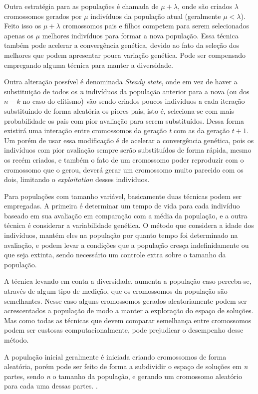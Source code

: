 Outra estratégia para as populações é chamada de \(\mu + \lambda\), onde são criados \(\lambda\) cromossomos gerados por \(\mu\) indivíduos da população atual (geralmente \(\mu < \lambda\)). Feito isso os \(\mu + \lambda\) cromossomos pais e filhos competem para serem selecionados apenas os \(\mu\) melhores indivíduos para formar a nova população. Essa técnica também pode acelerar a convergência genética, devido ao fato da seleção dos melhores que podem apresentar pouca variação genética. Pode ser compensado empregando alguma técnica para manter a diversidade.

Outra alteração possível é denominada \textit{Steady state}, onde em vez de haver a substituição de todos os \textit{n} indivíduos da população anterior para a nova (ou dos \(n - k\) no caso do elitismo) vão sendo criados poucos indivíduos a cada iteração substituindo de forma aleatória os piores pais, isto é, seleciona-se com mais probabilidade os pais com pior avaliação para serem substituídos. Dessa forma existirá uma interação entre cromossomos da geração \textit{t} com as da geração \(t+1\). Um porém de usar essa modificação é de acelerar a convergência genética, pois os indivíduos com pior avaliação sempre serão substituídos de forma rápida, mesmo os recém criados, e também o fato de um cromossomo poder reproduzir com o cromossomo que o gerou, deverá gerar um cromossomo muito parecido com os dois, limitando o \textit{exploitation} desses indivíduos.

Para populações com tamanho variável, basicamente duas técnicas podem ser empregadas. A primeira é determinar um tempo de vida para cada indivíduo baseado em sua avaliação em comparação com a média da população, e a outra técnica é considerar a variabilidade genética. O método que considera a idade dos indivíduos, mantém eles na população por quanto tempo foi determinado na avaliação, e podem levar a condições que a população cresça indefinidamente ou que seja extinta, sendo necessário um controle extra sobre o tamanho da população.

A técnica levando em conta a diversidade, aumenta a população caso perceba-se, através de algum tipo de medição, que os cromossomos da população são semelhantes. Nesse caso alguns cromossomos gerados aleatoriamente podem ser acrescentados a população de modo a manter a exploração do espaço de soluções. Mas como todas as técnicas que devem comparar semelhança entre cromossomos podem ser custosas computacionalmente, pode prejudicar o desempenho desse método.

A população inicial geralmente é iniciada criando cromossomos de forma aleatória, porém pode ser feito de forma a subdividir o espaço de soluções em \textit{n} partes, sendo \textit{n} o tamanho da população, e gerando um cromossomo aleatório para cada uma dessas partes. \cite{Linden2008}.

